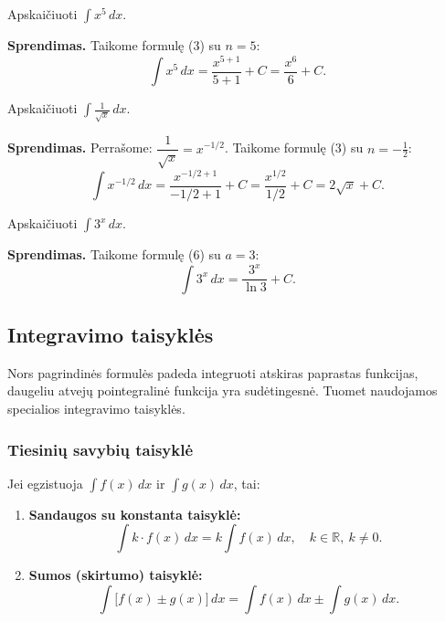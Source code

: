 \begin{example}
Apskaičiuoti $\displaystyle\int x^5\,dx$.

\textbf{Sprendimas.} Taikome formulę (3) su $n=5$:
\[
\int x^5\,dx = \frac{x^{5+1}}{5+1}+C = \frac{x^6}{6}+C.
\]
\end{example}

\begin{example}
Apskaičiuoti $\displaystyle\int \frac{1}{\sqrt{x}}\,dx$.

\textbf{Sprendimas.} Perrašome: $\dfrac{1}{\sqrt{x}} = x^{-1/2}$. Taikome formulę (3) su $n=-\tfrac{1}{2}$:
\[
\int x^{-1/2}\,dx = \frac{x^{-1/2+1}}{-1/2+1}+C = \frac{x^{1/2}}{1/2}+C = 2\sqrt{x}+C.
\]
\end{example}

\begin{example}
Apskaičiuoti $\displaystyle\int 3^x\,dx$.

\textbf{Sprendimas.} Taikome formulę (6) su $a=3$:
\[
\int 3^x\,dx = \frac{3^x}{\ln 3}+C.
\]
\end{example}

\subsection{Integravimo taisyklės}

Nors pagrindinės formulės padeda integruoti atskiras paprastas funkcijas, daugeliu atvejų pointegralinė funkcija yra sudėtingesnė. Tuomet naudojamos specialios integravimo taisyklės.

\subsubsection{Tiesinių savybių taisyklė}

\begin{theorem}
Jei egzistuoja $\int f(x)\,dx$ ir $\int g(x)\,dx$, tai:
\begin{enumerate}[label=\arabic*.]
\item \textbf{Sandaugos su konstanta taisyklė:}
\[
\int k\cdot f(x)\,dx = k\int f(x)\,dx, \quad k\in\mathbb{R},\ k\neq 0.
\]
\item \textbf{Sumos (skirtumo) taisyklė:}
\[
\int \bigl[f(x)\pm g(x)\bigr]\,dx = \int f(x)\,dx \pm \int g(x)\,dx.
\]
\end{enumerate}
\end{theorem}

